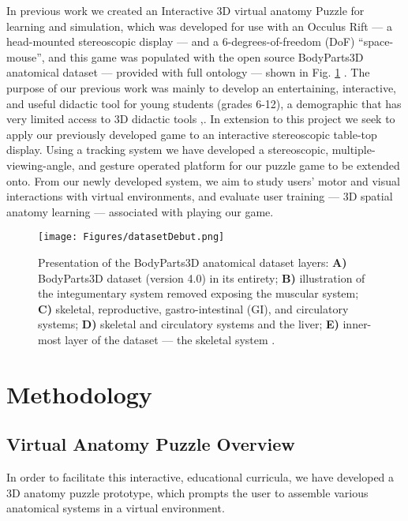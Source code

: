 \documentclass[]{spie}  %
\begin{document}
In previous work we created an Interactive 3D virtual anatomy Puzzle for learning and simulation, which was developed for use with an Occulus Rift --- a head-mounted stereoscopic display --- and a 6-degrees-of-freedom (DoF) “space-mouse”, and this game was populated with the open source BodyParts3D anatomical dataset --- provided with full ontology --- shown in Fig. \ref{fig:Dataset}  \cite{messier2016interactive}. The purpose of our previous work was mainly to develop an entertaining, interactive, and useful didactic tool for young students (grades 6-12), a demographic that has very limited access to 3D didactic tools \cite{messier2016interactive},\cite{brewer2012evaluation}. In extension to this project we seek to apply our previously developed game to an interactive stereoscopic table-top display. Using a tracking system we have developed a stereoscopic, multiple-viewing-angle, and gesture operated platform for our puzzle game to be extended onto. From our newly developed system, we aim to study users’ motor and visual interactions with virtual environments, and evaluate user training --- 3D spatial anatomy learning --- associated with playing our game.   

\begin{figure}[htb]
      \centering
      \texttt{[image: Figures/datasetDebut.png]}
      \caption{Presentation of the BodyParts3D anatomical dataset layers: \textbf{A)} BodyParts3D dataset (version 4.0) in its entirety; \textbf{B)} illustration of the integumentary system removed exposing the muscular system; \textbf{C)} skeletal, reproductive, gastro-intestinal (GI), and circulatory systems; \textbf{D)}  skeletal and circulatory systems and the liver; \textbf{E)} inner-most layer of the dataset --- the skeletal system \cite{messier2016interactive}.}
      \label{fig:Dataset}
\end{figure}

\section{Methodology}
\subsection{Virtual Anatomy Puzzle Overview}
In order to facilitate this interactive, educational curricula, we have developed a 3D anatomy puzzle prototype, which prompts the user to assemble various anatomical systems in a virtual environment. 
\end{document}
